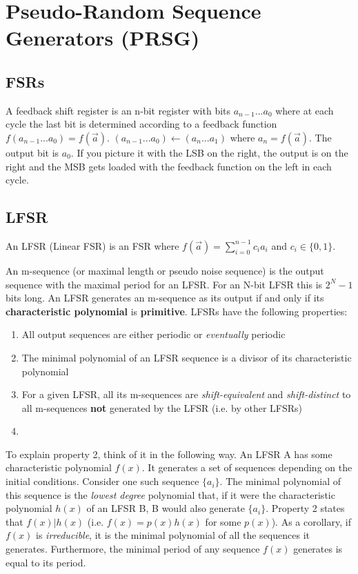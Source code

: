 \documentclass[11pt]{report}
\begin{document}
\section{Pseudo-Random Sequence Generators (PRSG)}\label{sec:PSRG}
\subsection{FSRs}
A feedback shift register is an n-bit register with bits $a_{n-1}...a_0$ where at each cycle the last bit is determined according to a feedback function $f(a_{n-1} ... a_0) = f(\vec{a})$. $(a_{n-1} ... a_0) \xleftarrow{} (a_n ... a_1)$ where $a_n = f(\vec{a})$. The output bit is $a_0$. If you picture it with the LSB on the right, the output is on the right and the MSB gets loaded with the feedback function on the left in each cycle.

\subsection{LFSR}\label{sec:LFSR}
An LFSR (Linear FSR) is an FSR where $f(\vec{a}) = \sum_{i = 0}^{n-1} c_ia_i$ and $c_i \in \{0, 1\}$.

An m-sequence (or maximal length or pseudo noise sequence) is the output sequence with the maximal period for an LFSR. For an N-bit LFSR this is $2^N-1$ bits long. An LFSR generates an m-sequence as its output if and only if its \textbf{characteristic polynomial} is \textbf{primitive}. LFSRs have the following properties:

\begin{enumerate}
	\item All output sequences are either periodic or \textit{eventually} periodic
	\item The minimal polynomial of an LFSR sequence is a divisor of its characteristic polynomial
	\item For a given LFSR, all its m-sequences are \textit{shift-equivalent} and \textit{shift-distinct} to all m-sequences \textbf{not} generated by the LFSR (i.e. by other LFSRs)
	\item
\end{enumerate}

To explain property 2, think of it in the following way. An LFSR A has some characteristic polynomial $f(x)$. It generates a set of sequences depending on the initial conditions. Consider one such sequence $\{a_i\}$. The minimal polynomial of this sequence is the \textit{lowest degree} polynomial that, if it were the characteristic polynomial $h(x)$ of an LFSR B, B would also generate $\{a_i\}$. Property 2 states that $f(x) | h(x)$ (i.e. $f(x) = p(x)h(x)$ for some $p(x)$). As a corollary, if $f(x)$ is \textit{irreducible}, it is the minimal polynomial of all the sequences it generates. Furthermore, the minimal period of any sequence $f(x)$ generates is equal to its period.
\end{document}
